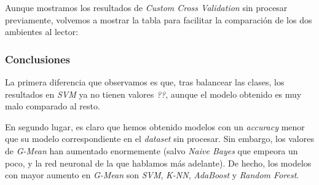 \documentclass[11pt]{article}
\begin{document}
Aunque mostramos los resultados de \emph{Custom Cross Validation} sin procesar previamente, volvemos a mostrar la tabla para facilitar la comparación de los dos ambientes al lector:

\begin{table}[H]
\begin{center}
\end{center}
    \caption{Resultados de \emph{Cross Validation}, para los distintos algoritmos estudiados, en el tercer \emph{dataset}, sin aplicar el balanceo de las clases}
\end{table}

\subsubsection{Conclusiones}

La primera diferencia que observamos es que, tras balancear las clases, los resultados en \emph{SVM} ya no tienen valores \emph{??}, aunque el modelo obtenido es muy malo comparado al resto.

En segundo lugar, es claro que hemos obtenido modelos con un \emph{accuracy} menor que su modelo correspondiente en el \emph{dataset} sin procesar. Sin embargo, los valores de \emph{G-Mean} han aumentado enormemente (salvo \emph{Naive Bayes} que empeora un poco, y la red neuronal de la que hablamos más adelante). De hecho, los modelos con mayor aumento en \emph{G-Mean} son \emph{SVM}, \emph{K-NN}, \emph{AdaBoost} y \emph{Random Forest}.
\end{document}
